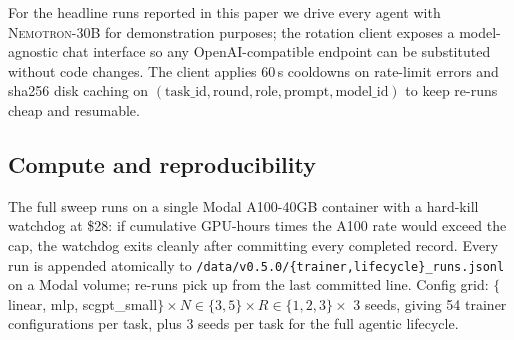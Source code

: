 For the headline runs reported in this paper we drive every agent with
\textsc{Nemotron-30B} for demonstration purposes; the rotation client
exposes a model-agnostic chat interface so any OpenAI-compatible
endpoint can be substituted without code changes. The client applies
60\,s cooldowns on rate-limit errors and sha256 disk caching on
$(\mathrm{task\_id},\mathrm{round},\mathrm{role},\mathrm{prompt},\mathrm{model\_id})$
to keep re-runs cheap and resumable.

\subsection{Compute and reproducibility}\label{subsec:compute}

The full sweep runs on a single Modal A100-40GB container with a
hard-kill watchdog at \$28: if cumulative GPU-hours times the A100
rate would exceed the cap, the watchdog exits cleanly after committing
every completed record. Every run is appended atomically to
\texttt{/data/v0.5.0/\{trainer,lifecycle\}\_runs.jsonl} on a Modal
volume; re-runs pick up from the last committed line. Config grid:
$\{$linear, mlp, scgpt\_small$\} \times N\in\{3,5\} \times
R\in\{1,2,3\} \times$ 3 seeds, giving 54 trainer configurations per
task, plus 3 seeds per task for the full agentic lifecycle.
